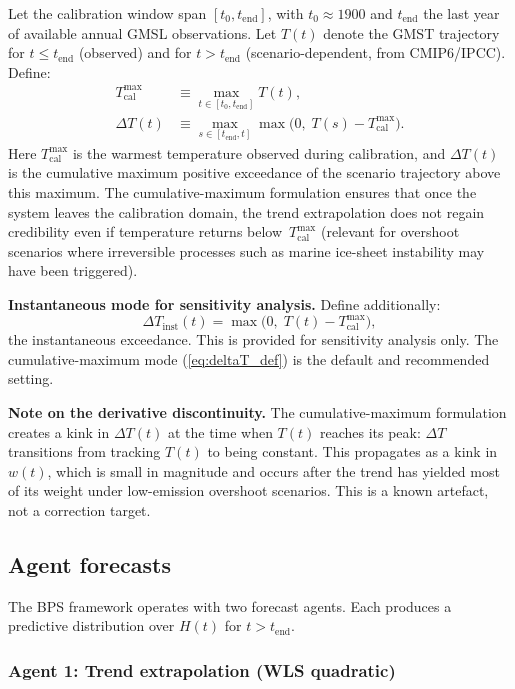 \documentclass[11pt]{article}
\newcommand{\dT}{\Delta T}
\newcommand{\tcal}{T_{\mathrm{cal}}^{\max}}
\newcommand{\tend}{t_{\mathrm{end}}}
\begin{document}
Let the calibration window span $[t_0, \tend]$, with $t_0 \approx 1900$ and $\tend$ the last year of available annual GMSL observations.  Let $T(t)$ denote the GMST trajectory for $t \le \tend$ (observed) and for $t > \tend$ (scenario-dependent, from CMIP6/IPCC).  Define:
\begin{align}
  \tcal &\equiv \max_{t \in [t_0, \tend]} T(t), \label{eq:Tcalmax} \\
  \dT(t) &\equiv \max_{s \in [\tend, t]} \max\!\big(0,\; T(s) - \tcal\big). \label{eq:deltaT_def}
\end{align}
Here $\tcal$ is the warmest temperature observed during calibration, and $\dT(t)$ is the cumulative maximum positive exceedance of the scenario trajectory above this maximum.  The cumulative-maximum formulation ensures that once the system leaves the calibration domain, the trend extrapolation does not regain credibility even if temperature returns below~$\tcal$ (relevant for overshoot scenarios where irreversible processes such as marine ice-sheet instability may have been triggered).

\textbf{Instantaneous mode for sensitivity analysis.}  Define additionally:
\begin{equation}
  \dT_{\mathrm{inst}}(t) = \max\!\big(0,\; T(t) - \tcal\big),
  \label{eq:deltaT_inst}
\end{equation}
the instantaneous exceedance.  This is provided for sensitivity analysis only.  The cumulative-maximum mode (\cref{eq:deltaT_def}) is the default and recommended setting.

\textbf{Note on the derivative discontinuity.}  The cumulative-maximum formulation creates a kink in $\dT(t)$ at the time when $T(t)$ reaches its peak: $\dT$ transitions from tracking $T(t)$ to being constant.  This propagates as a kink in $w(t)$, which is small in magnitude and occurs after the trend has yielded most of its weight under low-emission overshoot scenarios.  This is a known artefact, not a correction target.


\subsection{Agent forecasts}
\label{sec:agents}

The BPS framework operates with two forecast agents.  Each produces a predictive distribution over $H(t)$ for $t > \tend$.

\subsubsection{Agent 1: Trend extrapolation (WLS quadratic)}
\label{sec:trend_agent}
\end{document}
